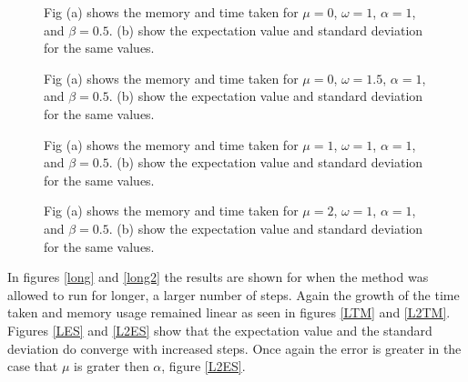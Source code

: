 \documentclass{article}
\begin{document}
\begin{figure}[!ht]
\centering
{}  

\caption{Fig (a) shows the memory and time taken for $\mu=0$, $\omega=1$, $\alpha=1$, and $\beta=0.5$. (b) show the expectation value and standard deviation for the same values.}
\label{Defult}
\end{figure}

\begin{figure}[!ht]
\centering
{}  

\caption{Fig (a) shows the memory and time taken for $\mu=0$, $\omega=1.5$, $\alpha=1$, and $\beta=0.5$. (b) show the expectation value and standard deviation for the same values.}
\label{one}
\end{figure}

\begin{figure}[!ht]
\centering
{}  

\caption{Fig (a) shows the memory and time taken for $\mu=1$, $\omega=1$, $\alpha=1$, and $\beta=0.5$. (b) show the expectation value and standard deviation for the same values.}
\label{two}
\end{figure}

\begin{figure}[!ht]
\centering
{}  

\caption{Fig (a) shows the memory and time taken for $\mu=2$, $\omega=1$, $\alpha=1$, and $\beta=0.5$. (b) show the expectation value and standard deviation for the same values.}
\label{three}
\end{figure}

In figures \ref{long} and \ref{long2} the results are shown for when the method was allowed to run for longer, a larger number of steps. Again the growth of the time taken and memory usage remained linear as seen in figures \ref{LTM} and \ref{L2TM}.  Figures \ref{LES} and \ref{L2ES} show that the expectation value and the standard deviation do converge with increased steps. Once again the error is greater in the case that $\mu$ is grater then $\alpha$, figure  \ref{L2ES}.
\end{document}
